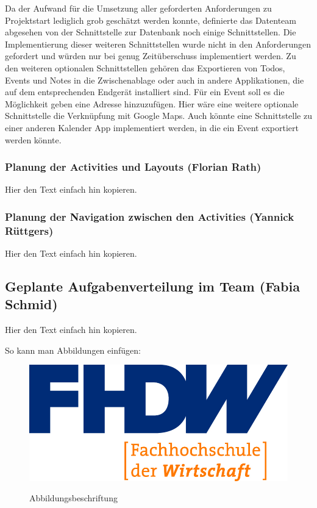 Da der Aufwand für die Umsetzung aller geforderten Anforderungen zu Projektstart lediglich grob geschätzt werden konnte, definierte das Datenteam abgesehen von der Schnittstelle zur Datenbank noch einige Schnittstellen. Die Implementierung dieser weiteren Schnittstellen wurde nicht in den Anforderungen gefordert und würden nur bei genug Zeitüberschuss implementiert werden. Zu den weiteren optionalen Schnittstellen gehören das Exportieren von Todos, Events und Notes in die Zwischenablage oder auch in andere Applikationen, die auf dem entsprechenden Endgerät installiert sind. Für ein Event soll es die Möglichkeit geben eine Adresse hinzuzufügen. Hier wäre eine weitere optionale Schnittstelle die Verknüpfung mit Google Maps. Auch könnte eine Schnittstelle zu einer anderen Kalender App implementiert werden, in die ein Event exportiert werden könnte.

\newpage

\subsubsection{Planung der Activities und Layouts (Florian Rath)}

Hier den Text einfach hin kopieren.

\subsubsection{Planung der Navigation zwischen den Activities (Yannick Rüttgers)}

Hier den Text einfach hin kopieren.

\subsection{Geplante Aufgabenverteilung im Team (Fabia Schmid)}

Hier den Text einfach hin kopieren.


So kann man Abbildungen einfügen:

\begin{figure}[H]
\centering
\begin{minipage}[t]{1\textwidth} %
\caption{Abbildungsbeschriftung} %
\includegraphics[width=1\textwidth]{img/fhdw}\\ %
\end{minipage}
\end{figure}

